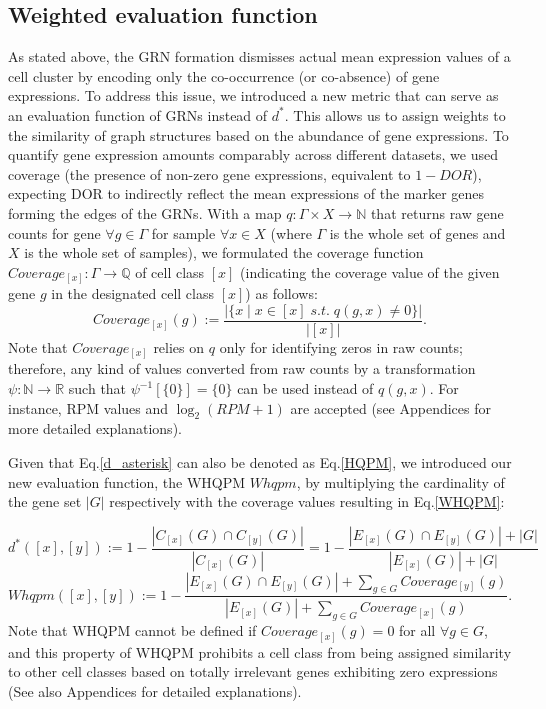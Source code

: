 \documentclass{article}
\begin{document}
\subsection*{Weighted evaluation function}
As stated above, the GRN formation dismisses actual mean expression values of a cell cluster by encoding only 
the co-occurrence (or co-absence) of gene expressions. To address this issue, we introduced a new metric that can 
serve as an evaluation function of GRNs instead of $d^*$. This allows us to assign weights to the similarity of graph 
structures based on the abundance of gene expressions. To quantify gene expression amounts comparably across 
different datasets, we used coverage (the presence of non-zero gene expressions, equivalent to $1-DOR$), expecting 
DOR to indirectly reflect the mean expressions of the marker genes forming the edges of the GRNs. With a map 
$q: \Gamma\times X\rightarrow \mathbb{N}$ that returns raw gene counts for gene $\forall g\in\Gamma$ for sample $\forall x\in X$ (where $\Gamma$ is the whole set of genes 
and $X$ is the whole set of samples), we formulated the coverage function $Coverage_{[x]}: \Gamma\rightarrow\mathbb{Q}$ of cell class $[x]$ 
(indicating the coverage value of the given gene $g$ in the designated cell class $[x]$) as follows:
\begin{equation}\label{coverage}
  Coverage_{[x]}(g):=\frac{
    |\{x\;|\;x\in[x]\;s.t.\;q(g,x)\neq 0\}|
  }{
    |[x]|
  }.
\end{equation}
Note that $Coverage_{[x]}$ relies on $q$ only for identifying zeros in raw counts; therefore, any kind of values converted 
from raw counts by a transformation $\psi: \mathbb{N}\rightarrow\mathbb{R}$ such that $\psi^{-1}[\{0\}]=\{0\}$ can be used instead of $q(g, x)$. For 
instance, \ac{RPM} values and $\log_2(RPM+1)$ are accepted (see Appendices for more detailed explanations).

Given that Eq.\eqref{d_asterisk} can also be denoted as Eq.\eqref{HQPM}, we introduced our new evaluation function, the \ac{WHQPM} 
$Whqpm$, by multiplying the cardinality of the gene set $|G|$ respectively 
with the coverage values resulting in Eq.\eqref{WHQPM}:

\begin{equation}\label{HQPM}
  d^*([x], [y]) := 1 - \frac{|C_{[x]}(G)\cap C_{[y]}(G)|}{|C_{[x]}(G)|}
  =1 - \frac{
    |E_{[x]}(G)\cap E_{[y]}(G)|+|G|
  }{
    |E_{[x]}(G)|+|G|
  }
\end{equation}
\begin{equation}\label{WHQPM}
  Whqpm([x], [y]) := 1 - \frac{
    |E_{[x]}(G)\cap E_{[y]}(G)|+\sum_{g\in G}Coverage_{[y]}(g)
  }{
    |E_{[x]}(G)|+\sum_{g\in G}Coverage_{[x]}(g)
  }.
\end{equation}
Note that \ac{WHQPM} cannot be defined if $Coverage_{[x]}(g)=0$ for all $\forall g\in G$, and this property of WHQPM prohibits 
a cell class from being assigned similarity to other cell classes based on totally irrelevant genes exhibiting zero 
expressions (See also Appendices for detailed explanations).
\end{document}
